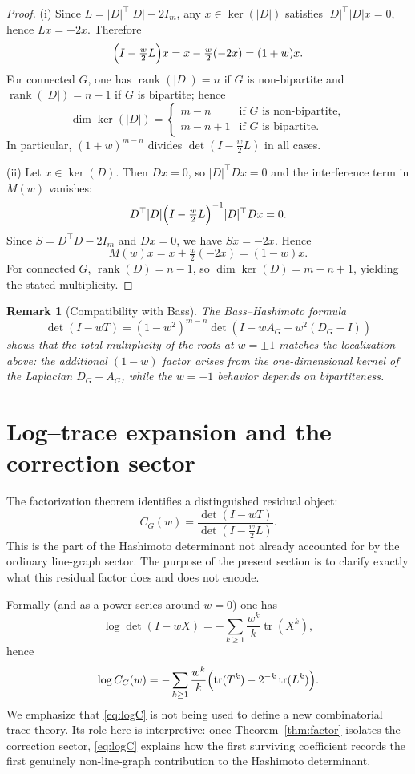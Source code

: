 \documentclass[11pt]{article}
\newtheorem{remark}{Remark}
\begin{document}
\begin{proof}
(i) Since $L=|D|^\top|D|-2I_m$, any $x\in\ker(|D|)$ satisfies
$|D|^\top|D|x=0$, hence $Lx=-2x$.
Therefore
\[
\Bigl(I-\tfrac{w}{2}L\Bigr)x
=
x-\tfrac{w}{2}(-2x)
=
(1+w)x.
\]
For connected $G$, one has $\operatorname{rank}(|D|)=n$ if $G$ is non-bipartite and $\operatorname{rank}(|D|)=n-1$ if $G$ is bipartite; hence
\[
\dim\ker(|D|)=
\begin{cases}
m-n & \text{if $G$ is non-bipartite},\\
m-n+1 & \text{if $G$ is bipartite}.
\end{cases}
\]
In particular, $(1+w)^{m-n}$ divides $\det(I-\tfrac{w}{2}L)$ in all cases.

(ii) Let $x\in\ker(D)$. Then $Dx=0$, so
$|D|^\top D x=0$ and the interference term in $M(w)$ vanishes:
\[
D^\top|D|
\Bigl(I-\tfrac{w}{2}L\Bigr)^{-1}
|D|^\top D x = 0.
\]
Since $S=D^\top D-2I_m$ and $Dx=0$,
we have $Sx=-2x$. Hence
\[
M(w)x
=
x+\tfrac{w}{2}(-2x)
=
(1-w)x.
\]
For connected $G$, $\operatorname{rank}(D)=n-1$,
so $\dim\ker(D)=m-n+1$, yielding the stated multiplicity.
\end{proof}

\begin{remark}[Compatibility with Bass]
The Bass--Hashimoto formula
\[
\det(I-wT)
=
(1-w^2)^{m-n}
\det(I-wA_G+w^2(D_G-I))
\]
shows that the total multiplicity of the roots at $w=\pm1$
matches the localization above:
the additional $(1-w)$ factor arises from the
one-dimensional kernel of the Laplacian $D_G-A_G$,
while the $w=-1$ behavior depends on bipartiteness.
\end{remark}

\section{Log--trace expansion and the correction sector}

The factorization theorem identifies a distinguished residual object:
\[
C_G(w)=\frac{\det(I-wT)}{\det(I-\tfrac w2 L)}.
\]
This is the part of the Hashimoto determinant not already accounted for by the ordinary line-graph sector. The purpose of the present section is to clarify exactly what this residual factor does and does not encode.

Formally (and as a power series around $w=0$) one has
\[
\log\det(I-wX)=-\sum_{k\ge1}\frac{w^k}{k}\operatorname{tr}(X^k),
\]
hence
\begin{equation}\label{eq:logC}
\log C_G(w)=-\sum_{k\ge1}\frac{w^k}{k}\Bigl(\operatorname{tr}(T^k)-2^{-k}\operatorname{tr}(L^k)\Bigr).
\end{equation}
We emphasize that \eqref{eq:logC} is not being used to define a new combinatorial trace theory. Its role here is interpretive: once Theorem~\ref{thm:factor} isolates the correction sector, \eqref{eq:logC} explains how the first surviving coefficient records the first genuinely non-line-graph contribution to the Hashimoto determinant.
\end{document}
